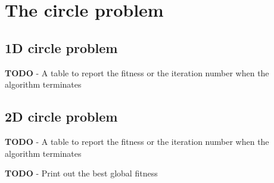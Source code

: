 \section{The circle problem}

\subsection{1D circle problem}
\textbf{TODO} - A table to report the fitness or the iteration number when the algorithm terminates

\subsection{2D circle problem}
\textbf{TODO} - A table to report the fitness or the iteration number when the algorithm terminates

\textbf{TODO} - Print out the best global fitness